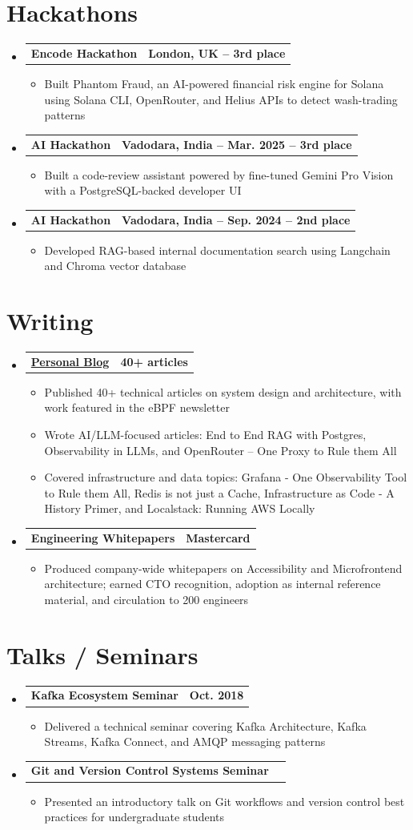 \documentclass[letterpaper,11pt]{article}
\makeatletter
\newcommand{\resumeItem}[1]{
  \item\small{
    {#1 \vspace{-3pt}}
  }
}
\newcommand{\resumeProjectHeading}[2]{
  \vspace{-3pt}\item
    \begin{tabular*}{1.0\textwidth}[t]{l@{\extracolsep{\fill}}r}
      \textbf{#1} & \textbf{\small #2} \\
    \end{tabular*}\vspace{-7pt}
}
\newcommand{\resumeSubHeadingListStart}{\begin{itemize}[leftmargin=0.0in, label={}]}
\newcommand{\resumeSubHeadingListEnd}{\end{itemize}}
\newcommand{\resumeItemListStart}{\begin{itemize}}
\newcommand{\resumeItemListEnd}{\end{itemize}\vspace{0pt}}
\makeatother
\begin{document}
\section{Hackathons}
\resumeSubHeadingListStart
    \resumeProjectHeading
      {Encode Hackathon}{London, UK -- 3rd place}
      \resumeItemListStart
        \resumeItem{Built Phantom Fraud, an AI-powered financial risk engine for Solana using Solana CLI, OpenRouter, and Helius APIs to detect wash-trading patterns}
      \resumeItemListEnd
    \resumeProjectHeading
      {AI Hackathon}{Vadodara, India -- Mar. 2025 -- 3rd place}
      \resumeItemListStart
        \resumeItem{Built a code-review assistant powered by fine-tuned Gemini Pro Vision with a PostgreSQL-backed developer UI}
      \resumeItemListEnd
    \resumeProjectHeading
      {AI Hackathon}{Vadodara, India -- Sep. 2024 -- 2nd place}
      \resumeItemListStart
        \resumeItem{Developed RAG-based internal documentation search using Langchain and Chroma vector database}
      \resumeItemListEnd
\resumeSubHeadingListEnd

\section{Writing}
\resumeSubHeadingListStart
    \resumeProjectHeading
      {\href{https://aymanace2049.hashnode.dev}{Personal Blog}}{40+ articles}
      \resumeItemListStart
        \resumeItem{Published 40+ technical articles on system design and architecture, with work featured in the eBPF newsletter}
        \resumeItem{Wrote AI/LLM-focused articles: End to End RAG with Postgres, Observability in LLMs, and OpenRouter -- One Proxy to Rule them All}
        \resumeItem{Covered infrastructure and data topics: Grafana - One Observability Tool to Rule them All, Redis is not just a Cache, Infrastructure as Code - A History Primer, and Localstack: Running AWS Locally}
      \resumeItemListEnd
    \resumeProjectHeading
      {Engineering Whitepapers}{Mastercard}
      \resumeItemListStart
        \resumeItem{Produced company-wide whitepapers on Accessibility and Microfrontend architecture; earned CTO recognition, adoption as internal reference material, and circulation to 200 engineers}
      \resumeItemListEnd
\resumeSubHeadingListEnd

\section{Talks / Seminars}
\resumeSubHeadingListStart
    \resumeProjectHeading
      {Kafka Ecosystem Seminar}{Oct. 2018}
      \resumeItemListStart
        \resumeItem{Delivered a technical seminar covering Kafka Architecture, Kafka Streams, Kafka Connect, and AMQP messaging patterns}
      \resumeItemListEnd
    \resumeProjectHeading
      {Git and Version Control Systems Seminar}{}
      \resumeItemListStart
        \resumeItem{Presented an introductory talk on Git workflows and version control best practices for undergraduate students}
      \resumeItemListEnd
\resumeSubHeadingListEnd
\end{document}
